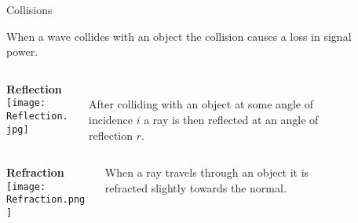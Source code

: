 \documentclass[final]{beamer}
\theoremstyle{plain}
\theoremstyle{definition}
\theoremstyle{remark}
\newlength{\sepwid}
\newlength{\twocolwid}
\newlength{\threecolwid}
\begin{document}
\begin{frame}[t]
\begin{columns}[t]
\begin{column}{\twocolwid}
\begin{columns}
\begin{column}{0.45\linewidth}
\end{column}
\end{columns}

\end{column} %

\begin{column}{\sepwid}\end{column} %
\begin{column}{\sepwid}\end{column} %
\begin{column}{\threecolwid} %




\begin{block}{Collisions}
\vspace{-1.5cm}

When a wave collides with an object the collision causes a loss in signal power. 
\vspace{0.5cm}
\begin{columns}
\begin{column}{0.5\linewidth}
\textbf{Reflection} \\
\texttt{[image: Reflection.jpg]} \cite{Reflection}
\end{column}
\begin{column}{0.5\linewidth}
 \\
After colliding with an object at some angle of incidence $i$ a ray is then reflected at an angle of reflection $r$.
\end{column}
\end{columns}
\begin{columns}
\begin{column}{0.5\linewidth}
\textbf{Refraction} \\
\texttt{[image: Refraction.png]} 
\cite{Refraction} 
\end{column}
\begin{column}{0.5\linewidth}
When a ray travels through an object it is refracted slightly towards the normal.
\end{column}
\end{columns}
\end{block}


\end{column}
\end{columns}
\end{frame}
\end{document}
